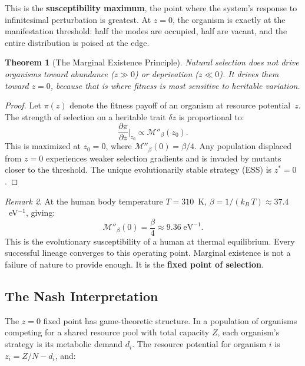 \documentclass[12pt, letterpaper]{article}
\theoremstyle{plain}
\newtheorem{theorem}{Theorem}[section]
\theoremstyle{definition}
\theoremstyle{remark}
\newtheorem{remark}[theorem]{Remark}
\newcommand{\Mop}{\mathcal{M}}            %
\begin{document}
This is the \textbf{susceptibility maximum}, the point where the system's response to infinitesimal perturbation is greatest. At $z = 0$, the organism is exactly at the manifestation threshold: half the modes are occupied, half are vacant, and the entire distribution is poised at the edge.

\begin{theorem}[The Marginal Existence Principle]\label{thm:marginal}
  Natural selection does not drive organisms toward abundance ($z \gg 0$) or deprivation ($z \ll 0$). It drives them toward $z = 0$, because that is where fitness is most sensitive to heritable variation.
\end{theorem}

\begin{proof}
  Let $\pi(z)$ denote the fitness payoff of an organism at resource potential~$z$. The strength of selection on a heritable trait $\delta z$ is proportional to:
  \begin{equation}
    \frac{\partial \pi}{\partial z}\bigg|_{z_0} \propto \Mop''_\beta(z_0).
  \end{equation}
  This is maximized at $z_0 = 0$, where $\Mop''_\beta(0) = \beta/4$. Any population displaced from $z = 0$ experiences weaker selection gradients and is invaded by mutants closer to the threshold. The unique evolutionarily stable strategy (ESS) is $z^* = 0$.
\end{proof}

\begin{remark}
  At the human body temperature $T = 310$~K, $\beta = 1/(k_{\!B}\,T) \approx 37.4$~eV$^{-1}$, giving:
  \begin{equation}
    \Mop''_\beta(0) = \frac{\beta}{4} \approx 9.36\;\text{eV}^{-1}.
  \end{equation}
  This is the evolutionary susceptibility of a human at thermal equilibrium. Every successful lineage converges to this operating point. Marginal existence is not a failure of nature to provide enough. It is the \textbf{fixed point of selection}.
\end{remark}

\subsection{The Nash Interpretation}

The $z = 0$ fixed point has game-theoretic structure. In a population of organisms competing for a shared resource pool with total capacity $Z$, each organism's strategy is its metabolic demand $d_i$. The resource potential for organism $i$ is $z_i = Z/N - d_i$, and:
\end{document}
